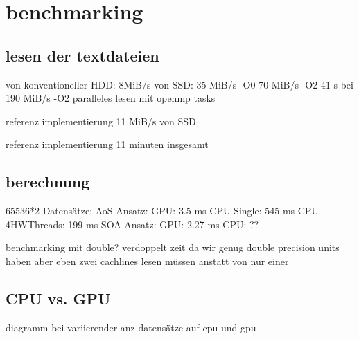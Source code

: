 \chapter{benchmarking}
\section{lesen der textdateien}
von konventioneller HDD: 8MiB/s
von SSD:  35 MiB/s -O0
70 MiB/s -O2
41 s bei 190 MiB/s -O2 paralleles lesen mit openmp tasks

referenz implementierung 11 MiB/s von SSD

referenz implementierung 11 minuten insgesamt


\section{berechnung}
65536*2 Datensätze:
AoS Ansatz: GPU: 3.5 ms CPU Single: 545 ms CPU 4HWThreads: 199 ms
SOA Ansatz: GPU: 2.27 ms CPU: ??

benchmarking mit double? verdoppelt zeit da wir genug double precision units haben aber eben zwei cachlines lesen müssen anstatt von nur einer

\section{CPU vs. GPU}

diagramm bei variierender anz datensätze auf cpu und gpu
